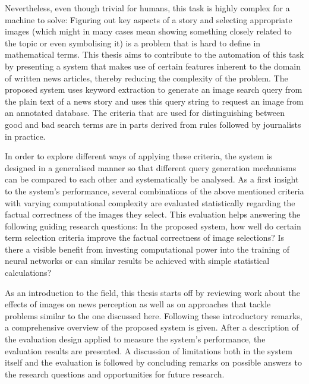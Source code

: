 \documentclass[11pt,a4paper,twoside]{article}
\begin{document}
Nevertheless, even though trivial for humans, this task is highly complex for a machine to solve: Figuring out key aspects of a story and selecting appropriate images (which might in many cases mean showing something closely related to the topic or even symbolising it) is a problem that is hard to define in mathematical terms. This thesis aims to contribute to the automation of this task by presenting a system that makes use of certain features inherent to the domain of written news articles, thereby reducing the complexity of the problem. The proposed system uses keyword extraction to generate an image search query from the plain text of a news story and uses this query string to request an image from an annotated database. The criteria that are used for distinguishing between good and bad search terms are in parts derived from rules followed by journalists in practice.

In order to explore different ways of applying these criteria, the system is designed in a generalised manner so that different query generation mechanisms can be compared to each other and systematically be analysed. As a first insight to the system's performance, several combinations of the above mentioned criteria with varying computational complexity are evaluated statistically regarding the factual correctness of the images they select. This evaluation helps answering the following guiding research questions: In the proposed system, how well do certain term selection criteria improve the factual correctness of image selections? Is there a visible benefit from investing computational power into the training of neural networks or can similar results be achieved with simple statistical calculations?

\bigskip

As an introduction to the field, this thesis starts off by reviewing work about the effects of images on news perception as well as on approaches that tackle problems similar to the one discussed here. Following these introductory remarks, a comprehensive overview of the proposed system is given. After a description of the evaluation design applied to measure the system's performance, the evaluation results are presented. A discussion of limitations both in the system itself and the evaluation is followed by concluding remarks on possible answers to the research questions and opportunities for future research.

\end{document}
